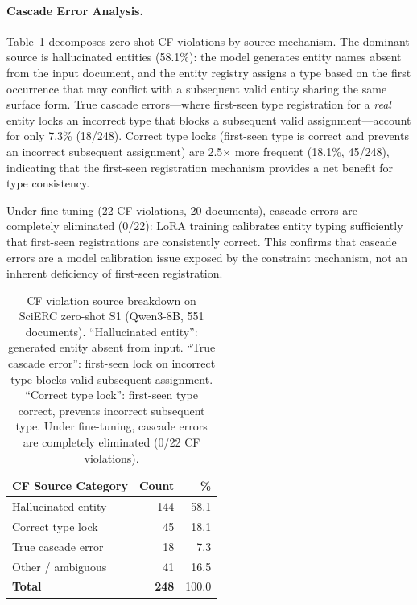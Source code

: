 
\paragraph{Cascade Error Analysis.}
\label{app:cascade-analysis}

Table~\ref{tab:cascade-breakdown} decomposes zero-shot CF violations by source mechanism.
The dominant source is hallucinated entities (58.1\%): the model generates entity names absent from the input document, and the entity registry assigns a type based on the first occurrence that may conflict with a subsequent valid entity sharing the same surface form.
True cascade errors---where first-seen type registration for a \emph{real} entity locks an incorrect type that blocks a subsequent valid assignment---account for only 7.3\% (18/248).
Correct type locks (first-seen type is correct and prevents an incorrect subsequent assignment) are 2.5$\times$ more frequent (18.1\%, 45/248), indicating that the first-seen registration mechanism provides a net benefit for type consistency.

Under fine-tuning (22 CF violations, 20 documents), cascade errors are completely eliminated (0/22): LoRA training calibrates entity typing sufficiently that first-seen registrations are consistently correct.
This confirms that cascade errors are a model calibration issue exposed by the constraint mechanism, not an inherent deficiency of first-seen registration.

\begin{table}[h]
\centering
\small
\begin{tabular}{@{}l rr@{}}
\toprule
\textbf{CF Source Category} & \textbf{Count} & \textbf{\%} \\
\midrule
Hallucinated entity & 144 & 58.1 \\
Correct type lock & 45 & 18.1 \\
True cascade error & 18 & 7.3 \\
Other / ambiguous & 41 & 16.5 \\
\midrule
\textbf{Total} & \textbf{248} & 100.0 \\
\bottomrule
\end{tabular}
\caption{CF violation source breakdown on SciERC zero-shot S1 (Qwen3-8B, 551 documents).
``Hallucinated entity'': generated entity absent from input.
``True cascade error'': first-seen lock on incorrect type blocks valid subsequent assignment.
``Correct type lock'': first-seen type correct, prevents incorrect subsequent type.
Under fine-tuning, cascade errors are completely eliminated (0/22 CF violations).}
\label{tab:cascade-breakdown}
\end{table}

